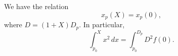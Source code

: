 We have the relation
$$x_p(X) = x_p(0),$$
where $D = (1 + X) D_p$. In particular,
$$\int_{p_0}^{X} x^2 \, dx = \int_{p_0}^{D_p} D^2 f(0).$$
